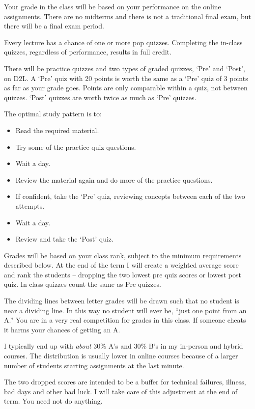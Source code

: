 \documentclass[letterpaper,10pt]{article}
\begin{document}
Your grade in the class will be based on your performance on the
online assignments.  There are no midterms and there is
not a traditional final exam, but there will be a final exam period.

Every lecture has a chance of one or more pop quizzes. Completing the
in-class quizzes, regardless of performance, results in full credit.

There will be practice quizzes and two types of graded quizzes, `Pre' and `Post', on D2L.  A `Pre'
quiz with 20 points is worth the same as a `Pre' quiz of 3 points as
far as your grade goes.  Points are only comparable within a quiz, not
between quizzes.  `Post' quizzes are worth twice as much as `Pre' quizzes.

The optimal study pattern is to:
\begin{itemize}
\item Read the required material.
\item Try some of the practice quiz questions.
\item Wait a day.
\item Review the material again and do more of the practice questions.
\item If confident, take the `Pre' quiz, reviewing concepts between each of the two attempts.
\item Wait a day.
\item Review and take the `Post' quiz.
\end{itemize}


Grades will be based on your class rank, subject to the minimum
requirements described below. At the end of the term I will create a
weighted average score and rank the students -- dropping the two
lowest pre quiz scores or lowest post quiz. In class quizzes count the same as Pre quizzes.  

The dividing lines between letter grades will be
drawn such that no student is near a dividing line. In this way no
student will ever be, ``just one point from an A.'' You are in a very
real competition for grades in this class. If someone cheats it harms
your chances of getting an A. 

I typically end up with \emph{about} 30\%
A's and 30\% B's in my in-person and hybrid courses.  The distribution is usually lower in online courses because of a larger number of students starting assignments at the last minute.   

The two dropped scores are intended to be a buffer for technical
failures, illness, bad days and other bad luck.  I will take care of
this adjustment at the end of term.  You need not do anything.
\end{document}
